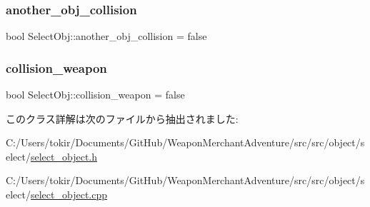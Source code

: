 \subsubsection{\texorpdfstring{another\+\_\+obj\+\_\+collision}{another\_obj\_collision}}
{\footnotesize\ttfamily bool Select\+Obj\+::another\+\_\+obj\+\_\+collision = false}

\mbox{\label{class_select_obj_a7678b8b51a55e9dcd2b8a003d54c08f5}} 
\subsubsection{\texorpdfstring{collision\+\_\+weapon}{collision\_weapon}}
{\footnotesize\ttfamily bool Select\+Obj\+::collision\+\_\+weapon = false}



このクラス詳解は次のファイルから抽出されました\+:\begin{DoxyCompactItemize}
\item 
C\+:/\+Users/tokir/\+Documents/\+Git\+Hub/\+Weapon\+Merchant\+Adventure/src/src/object/select/\mbox{\hyperlink{select__object_8h}{select\+\_\+object.\+h}}\item 
C\+:/\+Users/tokir/\+Documents/\+Git\+Hub/\+Weapon\+Merchant\+Adventure/src/src/object/select/\mbox{\hyperlink{select__object_8cpp}{select\+\_\+object.\+cpp}}\end{DoxyCompactItemize}
